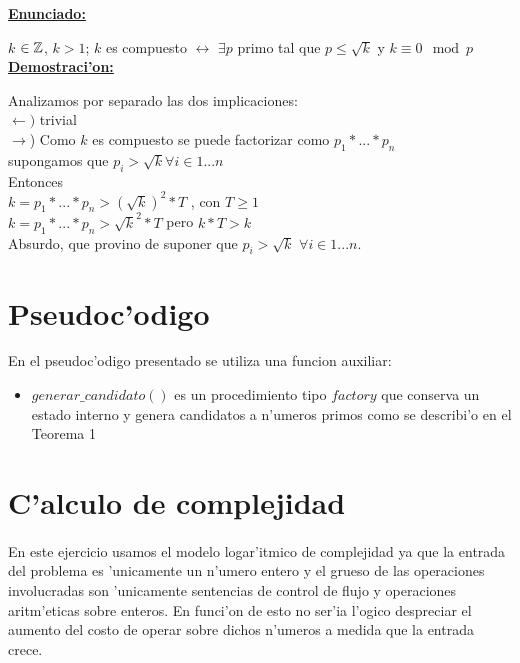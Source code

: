 \textbf{\underline{Enunciado:}\\}

$k$ ${\in {\mathbb Z}}$, $k>1$; $k$ es compuesto $\longleftrightarrow$ $\exists p$ primo tal que $p \leq \sqrt{k}$ y $k \equiv 0 \mod{p}$\\

\textbf{\underline{Demostraci'on:}\\}

Analizamos por separado las dos implicaciones: \\

$\leftarrow)$ trivial \\

$\rightarrow$) Como $k$ es compuesto se puede factorizar como $p_1*...*p_n$\\
supongamos que  $p_i > \sqrt{k} \forall i \in {1...n}$\\

Entonces \\

$k = p_1*...*p_n > (\sqrt{k})^2*T$ , con $T\geq1$\\  

$k = p_1*...*p_n > \sqrt{k}^2*T$ pero $k*T > k$ \\

Absurdo, que provino de suponer que $p_i > \sqrt{k}$ $\forall i \in {1...n}$.\\

\newpage
\section{Pseudoc'odigo}

En el pseudoc'odigo presentado se utiliza una funcion auxiliar:
\begin{itemize}
\item $generar\_candidato()$ es un procedimiento tipo $factory$ que conserva un estado interno 
y genera candidatos a n'umeros primos como se describi'o en el Teorema 1
\end{itemize}

\newpage
\section{C'alculo de complejidad}
\paragraph{}
En este ejercicio usamos el modelo logar'itmico de complejidad ya que la entrada del problema es 'unicamente un
n'umero entero y el grueso de las operaciones involucradas son 'unicamente sentencias de control de flujo
y operaciones aritm'eticas sobre enteros. En funci'on de esto no ser'ia l'ogico despreciar el aumento del costo
de operar sobre dichos n'umeros a medida que la entrada crece.

